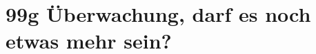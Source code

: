 \documentclass{scrartcl}
\begin{document}
\section*{99g Überwachung, darf es noch etwas mehr sein?}
\end{document}
